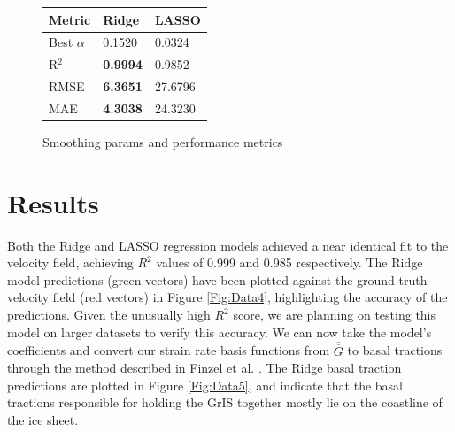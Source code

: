 \documentclass{article}
\begin{document}
\begin{figure}[!htb]
   \begin{minipage}{0.33\textwidth}
    \centering
     \begin{tabular}{l|l|l}
        \textbf{Metric} & \textbf{Ridge} & \textbf{LASSO} \\
        \hline
        Best $\alpha$ & 0.1520 & 0.0324 \\
        R$^{2}$ & \textbf{0.9994} & 0.9852 \\
        RMSE & \textbf{6.3651} & 27.6796 \\
        MAE & \textbf{4.3038} & 24.3230 \\
    \end{tabular}
    \caption{Smoothing params and performance metrics}\label{Fig:Data1c}
  \end{minipage}
\end{figure}

\section{Results}

Both the Ridge and LASSO regression models achieved a near identical fit to the velocity field, achieving $R^{2}$ values of 0.999 and 0.985 respectively. The Ridge model predictions (green vectors) have been plotted against the ground truth velocity field (red vectors) in Figure \ref{Fig:Data4}, highlighting the accuracy of the predictions. Given the unusually high $R^{2}$ score, we are planning on testing this model on larger datasets to verify this accuracy. We can now take the model's coefficients and convert our strain rate basis functions from $\overline{\overline{G}}$ to basal tractions through the method described in Finzel et al. \cite{finzel_surface_2015}. The Ridge basal traction predictions are plotted in Figure \ref{Fig:Data5}, and indicate that the basal tractions responsible for holding the GrIS together mostly lie on the coastline of the ice sheet.

\end{document}
